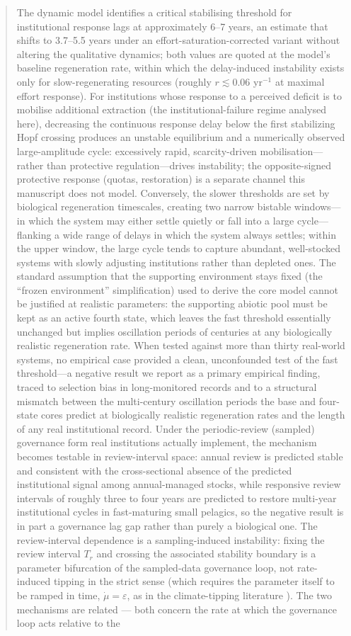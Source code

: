\documentclass[twocolumn,10pt]{article}
\begin{document}
\begin{abstract}
The dynamic model identifies a critical stabilising threshold for institutional response lags at approximately 6--7 years, an estimate that shifts to 3.7--5.5 years under an effort-saturation-corrected variant without altering the qualitative dynamics; both values are quoted at the model's baseline regeneration rate, within which the delay-induced instability exists only for slow-regenerating resources (roughly $r\lesssim0.06$ yr$^{-1}$ at maximal effort response). For institutions whose response to a perceived deficit is to mobilise additional extraction (the institutional-failure regime analysed here), decreasing the continuous response delay below the first stabilizing Hopf crossing produces an unstable equilibrium and a numerically observed large-amplitude cycle: excessively rapid, scarcity-driven mobilisation---rather than protective regulation---drives instability; the opposite-signed protective response (quotas, restoration) is a separate channel this manuscript does not model. Conversely, the slower thresholds are set by biological regeneration timescales, creating two narrow bistable windows---in which the system may either settle quietly or fall into a large cycle---flanking a wide range of delays in which the system always settles; within the upper window, the large cycle tends to capture abundant, well-stocked systems with slowly adjusting institutions rather than depleted ones. The standard assumption that the supporting environment stays fixed (the ``frozen environment'' simplification) used to derive the core model cannot be justified at realistic parameters: the supporting abiotic pool must be kept as an active fourth state, which leaves the fast threshold essentially unchanged but implies oscillation periods of centuries at any biologically realistic regeneration rate. When tested against more than thirty real-world systems, no empirical case provided a clean, unconfounded test of the fast threshold---a negative result we report as a primary empirical finding, traced to selection bias in long-monitored records and to a structural mismatch between the multi-century oscillation periods the base and four-state cores predict at biologically realistic regeneration rates and the length of any real institutional record. Under the periodic-review (sampled) governance form real institutions actually implement, the mechanism becomes testable in review-interval space: annual review is predicted stable and consistent with the cross-sectional absence of the predicted institutional signal among annual-managed stocks, while responsive review intervals of roughly three to four years are predicted to restore multi-year institutional cycles in fast-maturing small pelagics, so the negative result is in part a governance lag gap rather than purely a biological one. The review-interval dependence is a sampling-induced instability: fixing the review interval $T_r$ and crossing the associated stability boundary is a parameter bifurcation of the sampled-data governance loop, not rate-induced tipping in the strict sense (which requires the parameter itself to be ramped in time, $\dot\mu=\varepsilon$, as in the climate-tipping literature \cite{ashwin2012}). The two mechanisms are related --- both concern the rate at which the governance loop acts relative to the 
\end{abstract}
\end{document}
